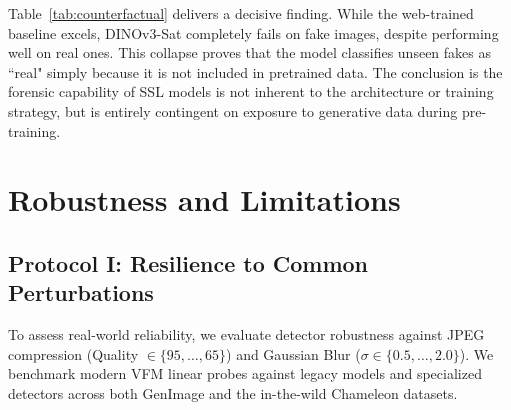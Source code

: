 \documentclass[sigconf,screen]{acmart}
\theoremstyle{plain}
\theoremstyle{definition}
\theoremstyle{remark}
\begin{document}
\begin{table}[t]
\centering
\caption{\textbf{Counterfactual Analysis.} Comparison of DINOv3 trained on Web Data vs. Satellite Data.}
\label{tab:counterfactual}
\vspace{-10pt}
\end{table}

Table~\ref{tab:counterfactual} delivers a decisive finding. While the web-trained baseline excels, DINOv3-Sat completely fails on fake images, despite performing well on real ones. This collapse proves that the model classifies unseen fakes as ``real" simply because it is not included in pretrained data. The conclusion is the forensic capability of SSL models is not inherent to the architecture or training strategy, but is entirely contingent on exposure to generative data during pre-training.


\section{Robustness and Limitations}

\subsection{Protocol I: Resilience to Common Perturbations}
\label{subsec:robust_perturbation}

To assess real-world reliability, we evaluate detector robustness against JPEG compression (Quality $\in \{95, \dots, 65\}$) and Gaussian Blur ($\sigma \in \{0.5, \dots, 2.0\}$). We benchmark modern VFM linear probes against legacy models and specialized detectors across both GenImage and the in-the-wild Chameleon datasets.
\end{document}
